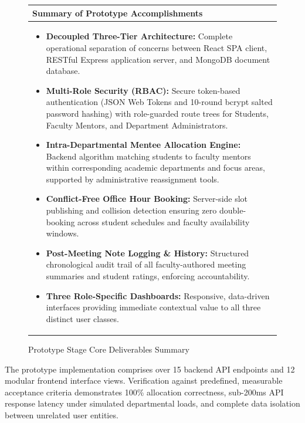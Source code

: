 \documentclass[11pt,a4paper]{article}
\begin{document}
\begin{figure}[H]
\centering
\begin{tabular}{|p{}|}
\hline
\rowcolor{lightgray} \textbf{\color{primary}Summary of Prototype Accomplishments} \\
\hline
\begin{itemize}[leftmargin=1.4em, itemsep=0.15em]
  \item \textbf{Decoupled Three-Tier Architecture:} Complete operational separation of concerns between React SPA client, RESTful Express application server, and MongoDB document database.
  \item \textbf{Multi-Role Security (RBAC):} Secure token-based authentication (JSON Web Tokens and 10-round bcrypt salted password hashing) with role-guarded route trees for Students, Faculty Mentors, and Department Administrators.
  \item \textbf{Intra-Departmental Mentee Allocation Engine:} Backend algorithm matching students to faculty mentors within corresponding academic departments and focus areas, supported by administrative reassignment tools.
  \item \textbf{Conflict-Free Office Hour Booking:} Server-side slot publishing and collision detection ensuring zero double-booking across student schedules and faculty availability windows.
  \item \textbf{Post-Meeting Note Logging \& History:} Structured chronological audit trail of all faculty-authored meeting summaries and student ratings, enforcing accountability.
  \item \textbf{Three Role-Specific Dashboards:} Responsive, data-driven interfaces providing immediate contextual value to all three distinct user classes.
\end{itemize} \\
\hline
\end{tabular}
\caption{Prototype Stage Core Deliverables Summary}
\end{figure}

The prototype implementation comprises over 15 backend API endpoints and 12 modular frontend interface views. Verification against predefined, measurable acceptance criteria demonstrates 100\% allocation correctness, sub-200ms API response latency under simulated departmental loads, and complete data isolation between unrelated user entities.

\end{document}
